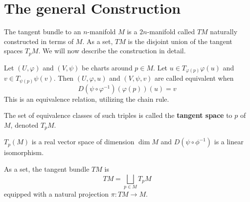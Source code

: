 \section{The general Construction}
The tangent bundle to an $n$-manifold $M$ is a $2n$-manifold called
$TM$ naturally constructed in terms of $M$. As a set, $TM$ is the
disjoint union of the tangent spaces $T_p M$. We will now describe 
the construction in detail.

\begin{definition}
Let $(U,\varphi)$ and $(V,\psi)$ be charts around $p \in M$.
Let $u \in T_{\varphi(p)}\varphi(u)$ and $v\in T_{\psi(p)}\psi(v)$.
Then $(U,\varphi, u)$ and $(V, \psi, v)$ are called equivalent when
\[
D(\psi \circ \varphi^{-1})(\varphi(p))(u) = v
\]
This is an equivalence relation, utilizing the chain rule.

The set of equivalence classes of such triples is called the 
\textbf{tangent space} to $p$ of $M$, denoted $T_p M$.
\end{definition}

$T_p(M)$ is a real vector space of dimension $\dim M$ and $D(\psi \circ \phi^{-1})$ is 
a linear isomorphism.

As a set, the tangent bundle $TM$ is
\[ 
TM=\bigsqcup_{p \in M} T_p M 
\]
equipped with a natural projection $\pi : TM \to M$.
